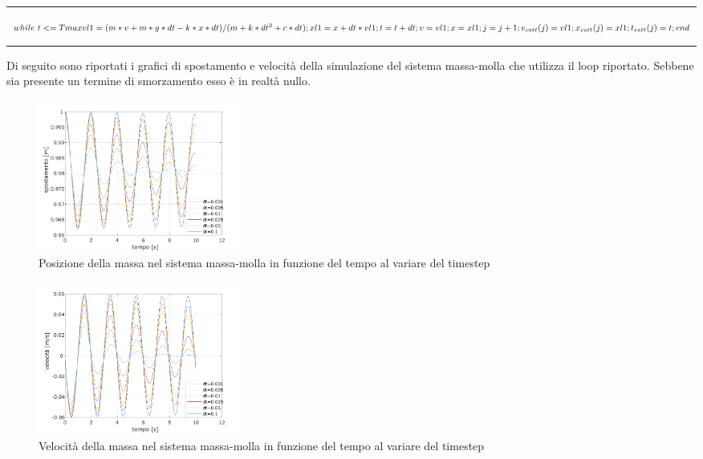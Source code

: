 \noindent\rule{\textwidth}{1pt}\newline  $ 
    while \  t<= Tmax \\
        vl1 = (m*v+m*g*dt-k*x*dt)/(m+k*dt^2+c*dt); \\
        xl1 = x + dt*vl1; \\
        t = t+ dt; \\
        v = vl1; \\
        x = xl1; \\
        j = j+1; \\
        v_{vett}(j) = vl1; \\
        x_{vett}(j) = xl1; \\
        t_{vett}(j) = t; \\
    end$ \newline
\noindent\rule{\textwidth}{1pt}
Di seguito sono riportati i grafici di spostamento e velocità della simulazione del sistema massa-molla che utilizza il loop riportato. Sebbene sia presente un termine di smorzamento esso è in realtà nullo. 

\begin{figure}[ht]
\centering
\includegraphics[height=5cm]{Figure/position.pdf}
\caption{Posizione della massa nel sistema massa-molla in funzione del tempo al variare del timestep}
 \label{fig:Newton_1d}
\end{figure}

\begin{figure}[h!]
\centering
\includegraphics[height=5cm]{Figure/speed.pdf}
\caption{Velocità della massa nel sistema massa-molla in funzione del tempo al variare del timestep}
 \label{fig:Newton_1d}
\end{figure}

